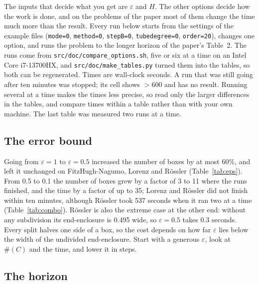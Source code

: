 \documentclass[11pt,a4paper]{article}
\newcommand{\file}[1]{\nolinkurl{#1}}
\newcommand{\eps}{\varepsilon}
\begin{document}
The inputs that decide what you get are $\eps$ and $H$. The other options
decide how the work is done, and on the problems of the paper most of them
change the time much more than the result. Every run below starts from the
settings of the example files
(\texttt{mode=0}, \texttt{method=0}, \texttt{stepB=0}, \texttt{tubedegree=0},
\texttt{order=20}), changes one option, and runs the problem to the longer
horizon of the paper's Table~2. The runs come from
\file{src/doc/compare_options.sh}, five or six at a time on an Intel Core
i7-13700HX,
and \file{src/doc/make_tables.py} turned them into the tables, so both can be
regenerated. Times are wall-clock seconds. A run that was still going after
ten minutes was stopped; its cell shows $>$600 and has no result. Running
several at a time makes the times less precise, so read only the larger
differences in the tables, and compare times within a table rather than
with your own machine. The last table was measured two runs at a time.

\subsection{The error bound}

\begin{table}[htb]
\centering\small
\caption{Time and number of boxes as $\eps$ shrinks (all other options at
  their defaults).}
\label{tab:eps}

\end{table}

Going from $\eps = 1$ to $\eps = 0.5$ increased the number of boxes by at
most 60\%, and left it unchanged on FitzHugh-Nagumo, Lorenz and R\"ossler
(Table~\ref{tab:eps}). From 0.5 to 0.1 the number of boxes grew by a factor
of 3 to 11 where the runs finished, and the time by a factor of up to 35;
Lorenz and R\"ossler did not finish within ten minutes, although R\"ossler
took 537 seconds when it ran two at a time (Table~\ref{tab:combo}).
R\"ossler is also the extreme case at the other end: without any
subdivision its end-enclosure is 0.495 wide, so $\eps = 0.5$ takes 0.3
seconds. Every split halves one side of a box, so the cost
depends on how far $\eps$ lies below the width of the undivided
end-enclosure. Start with a generous $\eps$, look at $\#(C)$ and the time,
and lower it in steps.

\subsection{The horizon}
\end{document}
